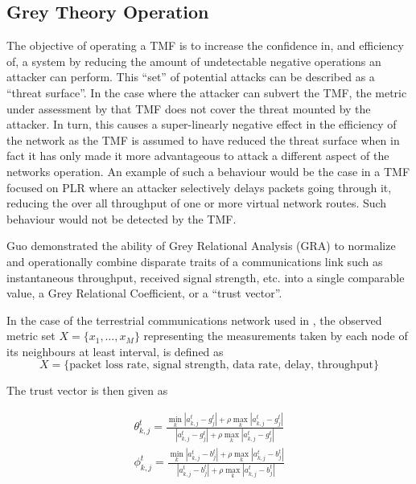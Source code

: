 \documentclass[runningheads,a4paper]{llncs}
\begin{document}
\subsection{Grey Theory Operation}

The objective of operating a TMF is to increase the confidence in, and efficiency of, a system by reducing the amount of undetectable negative operations an attacker can perform.
This ``set'' of potential attacks can be described as a ``threat surface''.
In the case where the attacker can subvert the TMF, the metric under assessment by that TMF does not cover the threat mounted by the attacker.
In turn, this causes a super-linearly negative effect in the efficiency of the network as the TMF is assumed to have reduced the threat surface when in fact it has only made it more advantageous to attack a different aspect of the networks operation.
An example of such a behaviour would be the case in a TMF focused on PLR where an attacker selectively delays packets going through it, reducing the over all throughput of one or more virtual network routes.
Such behaviour would not be detected by the TMF.

Guo\cite{Guo2012} demonstrated the ability of Grey Relational Analysis (GRA)\cite{Zuo1995} to normalize and operationally combine disparate traits of a communications link such as instantaneous throughput, received signal strength, etc. into a single comparable value, a Grey Relational Coefficient, or a ``trust vector''.

In the case of the terrestrial communications network used in \cite{Guo2012}, the observed metric set $X = \{x_1,\dots,x_M\}$ representing the measurements taken by each node of its neighbours at least interval, is defined as 
\begin{equation}
  \label{eq:terrmetrics}
  X=\{\text{packet loss rate, signal strength, data rate, delay, throughput}\}
\end{equation}

The trust vector is then given as

\begin{align}
  \label{eq:grc}
  \theta_{k,j}^t = \frac{\min_k|a_{k,j}^t - g_j^t| + \rho \max_k|a_{k,j}^t-g_j^t|}{|a_{k,j}^t-g_j^t| + \rho \max_k|a_{k,j}^t-g_j^t|} \\
  \phi_{k,j}^t = \frac{\min_k|a_{k,j}^t - b_j^t| + \rho \max_k|a_{k,j}^t-b_j^t|}{|a_{k,j}^t-b_j^t| + \rho \max_k|a_{k,j}^t-b_j^t|}  \\
\end{align}
\end{document}
